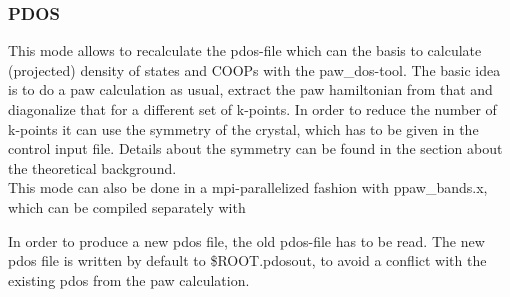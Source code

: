 \documentclass[final,12pt]{article}
\begin{document}
{{{{{{\bigskip{}\bigskip

\subsubsection{PDOS}
This mode allows to recalculate the pdos-file which can the basis to 
calculate (projected) density of states and COOPs with the paw\_dos-tool.
The basic idea is to do a paw calculation as usual, extract the paw 
hamiltonian from that and diagonalize that for a different set of k-points.
In order to reduce the number of k-points it can use the symmetry of the 
crystal, which has to be given in the control input file. Details about 
the symmetry can be found in the section about the theoretical background.
\\
This mode can also be done in a  mpi-parallelized fashion with 
ppaw\_bands.x, which can be compiled separately with 

\bigskip{}\bigskip

\noindent
In order to produce a new pdos file, the old pdos-file has to be read.
The new pdos file is written by default to \$ROOT.pdosout, to avoid a 
conflict with the existing pdos from the paw calculation.


}}}}}}
\end{document}
